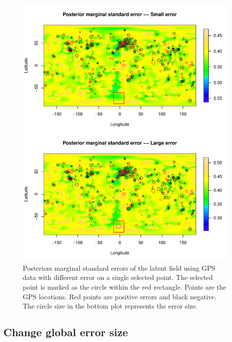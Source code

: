 \documentclass[a4paper,12pt]{article}
\begin{document}
 \begin{figure}[htbp]
 \begin{center}
 \includegraphics[scale=0.8]{fig/PointErr_GIAfield.pdf}
 \end{center}
 \caption[Posterior marginal standard errors of the latent field]{Posteriors marginal standard errors of the latent field using GPS data with different error on a single selected point. The selected point is marked as the circle within the red rectangle. Points are the GPS locations. Red points are positive errors and black negative. The circle size in the bottom plot represents the error size.}
 \label{fig:6}
 \end{figure}
 
 \newpage
 \subsection{Change global error size}
\end{document}
